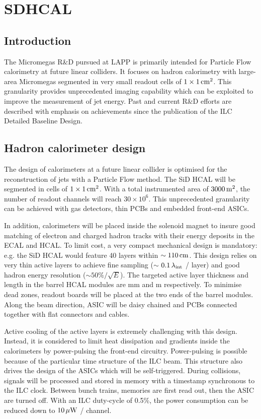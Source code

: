\section{SDHCAL}

\subsection{Introduction}
The Micromegas R\&D pursued at LAPP is primarily intended for Particle Flow calorimetry at future linear colliders. It focuses on hadron calorimetry with large-area Micromegas segmented in very small readout cells of $1\times\unit[1]{cm^{2}}$. This granularity provides unprecedented imaging capability which can be exploited to improve the measurement of jet energy. Past and current R\&D efforts are described with emphasis on achievements since the publication of the ILC Detailed Baseline Design.


\subsection{Hadron calorimeter design}

The design of calorimeters at a future linear collider is optimised for the reconstruction of jets with a Particle Flow method. The SiD HCAL will be segmented in cells of $1\times \unit[1]{cm^2}$. With a total instrumented area of $\unit[3000]{m^{2}}$, the number of readout channels will reach $30\times 10^{6}$. This unprecedented granularity can be achieved with gas detectors, thin PCBs and embedded front-end ASICs.

In addition, calorimeters will be placed inside the solenoid magnet to insure good matching of electron and charged hadron tracks with their energy deposits in the ECAL and HCAL. To limit cost, a very compact mechanical design is mandatory: e.g. the SiD HCAL would feature 40 layers within $\sim\unit[110]{cm}$. This design relies on very thin active layers to achieve fine sampling ($\sim$ $\unit[0.1]{\lambda_{int}}$ / layer) and good hadron energy resolution ($\sim 50\% / \sqrt{E}$). The targeted active layer thickness and length in the barrel HCAL modules are \unit[8]{mm} and \unit[3]{m} respectively. To minimise dead zones, readout boards will be placed at the two ends of the barrel modules. Along the beam direction, ASIC will be daisy chained and PCBs connected together with flat connectors and cables.

Active cooling of the active layers is extremely challenging with this design. Instead, it is considered to limit heat dissipation and gradients inside the calorimeters by power-pulsing the front-end circuitry. Power-pulsing is possible because of the particular time structure of the ILC beam. This structure also drives the design of the ASICs which will be self-triggered. During collisions, signals will be processed and stored in memory with a timestamp synchronous to the ILC clock. Between bunch trains, memories are first read out, then the ASIC are turned off. With an ILC duty-cycle of 0.5\%, the power consumption can be reduced down to $\unit[10]{\mu W}$ / channel.

